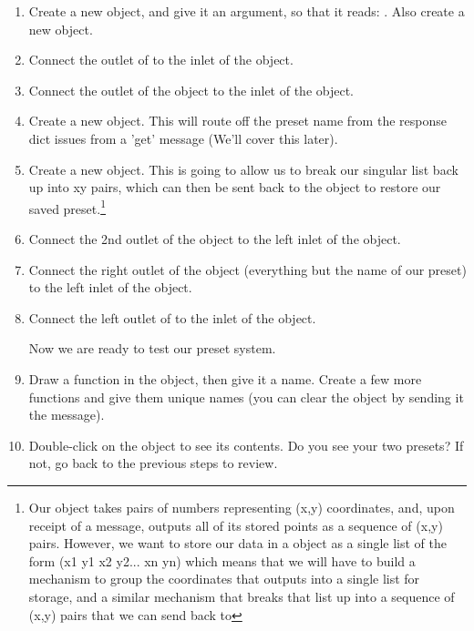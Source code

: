 \begin{enumerate}
\item Create a new  object, and give it an argument, so that it reads: .  Also create a new  object.
\item Connect the outlet of  to the inlet of the  object.
\item Connect the outlet of the  object to the inlet of the  object.
\item Create a new  object.  This will route off the preset name from the response dict issues from a 'get' message (We'll cover this later).
\item Create a new  object.  This is going to allow us to break our singular list back up into xy pairs, which can then be sent back to the  object to restore our saved preset.\footnote[2]{Our  object takes pairs of numbers representing (x,y) coordinates, and, upon receipt of a  message, outputs all of its stored points as a sequence of (x,y) pairs.  However, we want to store our data in a  object as a single list of the form (x1 y1 x2 y2... xn yn) which means that we will have to build a mechanism to group the coordinates that  outputs into a single list for storage, and a similar mechanism that breaks that list up into a sequence of (x,y) pairs that we can send back to }
\item Connect the 2nd outlet of the  object to the left inlet of the  object.
\item Connect the right outlet of the  object (everything but the name of our preset) to the left inlet of the  object. 
\item Connect the left outlet of  to the inlet of the  object.

Now we are ready to test our preset system.

\item Draw a function in the  object, then give it a name.  Create a few more functions and give them unique names (you can clear the  object by sending it the  message).
\item Double-click on the  object to see its contents.  Do you see your two presets?  If not, go back to the previous steps to review.
\end{enumerate}

